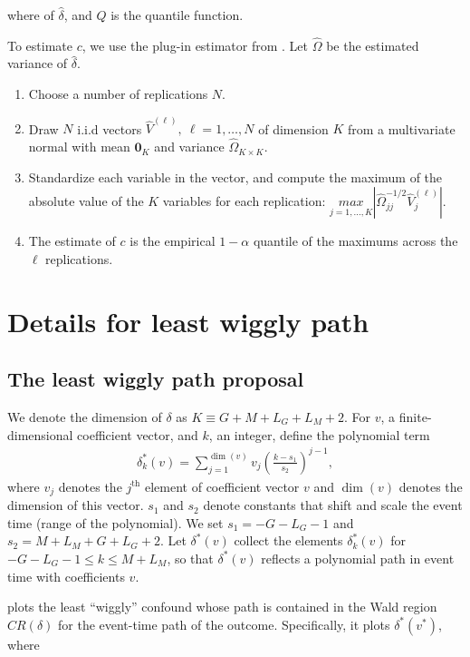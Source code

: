 \documentclass[12pt]{article}
\begin{document}
where of $\hat{\delta}$, and $Q$ is the quantile function.

To estimate $c$, we use the plug-in estimator from \cite{montiel2019simultaneous}.
Let $\hat{\Omega}$ be the estimated variance of $\hat{\delta}$.
\begin{enumerate}
\item Choose a number of replications $N$.
\item Draw $N$ i.i.d vectors $\hat{V}^{(\ell)},\ \ell = 1,\ldots,N$ of dimension $K$ from a multivariate normal with mean $\mathbf{0}_K$ and variance $\hat{\Omega}_{K \times K}$.
\item Standardize each variable in the vector, and compute the maximum of the absolute value of the $K$ variables for each replication: $\underset{j=1,...,K}{max} \left| \hat{\Omega}_{jj}^{-1/2} \hat{V}_j^{(\ell)} \right|$.
\item The estimate of $c$ is the empirical $1-\alpha$ quantile of the maximums across the $\ell$ replications.
\end{enumerate}
\section{Details for least wiggly path}
\label{sec:smoothest_path}

\subsection{The least wiggly path proposal}

We denote the dimension of $\delta$ as $K \equiv G + M + L_G + L_M + 2$. For $v$, a finite-dimensional coefficient vector, and $k$, an integer, define the polynomial term
\begin{align*}
\delta_k^*(v) = \sum_{j=1}^{\dim(v)} v_j (\frac{k-s_1}{s_2})^{j-1},
\end{align*}
 where $v_j$ denotes the $j^{\text{th}}$ element of coefficient vector $v$ and $\dim(v)$ denotes the dimension of this vector. $s_1$ and $s_2$ denote constants that shift and scale the event time (range of the polynomial).
We set $s_1 = -G-L_G-1$ and $s_2 = M + L_M + G + L_G +2$. Let $\delta^*(v)$ collect the elements $\delta_k^*(v)$ for $-G-L_G-1 \leq k \leq M+L_M$, so that $\delta^*(v)$ reflects a polynomial path in event time with coefficients $v$.

\xtevent plots the least ``wiggly'' confound whose path is contained in the Wald region $CR(\delta)$ for the event-time path of the outcome.
Specifically, it plots $\delta^*(v^*)$, where
\end{document}
